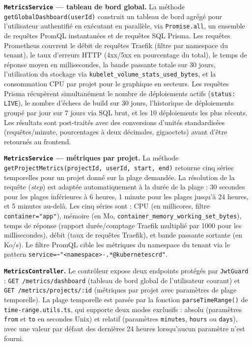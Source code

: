 \textbf{\texttt{MetricsService} — tableau de bord global.} La méthode \texttt{getGlobalDashboard(userId)} construit un tableau de bord agrégé pour l'utilisateur authentifié en exécutant en parallèle, via \texttt{Promise.all}, un ensemble de requêtes PromQL instantanées et de requêtes SQL Prisma. Les requêtes Prometheus couvrent le débit de requêtes Traefik (filtre par namespace du tenant), le taux d'erreurs HTTP (4xx/5xx en pourcentage du total), le temps de réponse moyen en millisecondes, la bande passante totale sur 30 jours, l'utilisation du stockage via \texttt{kubelet\_volume\_stats\_used\_bytes}, et la consommation CPU par projet pour le graphique en secteurs. Les requêtes Prisma récupèrent simultanément le nombre de déploiements actifs (\texttt{status: LIVE}), le nombre d'échecs de build sur 30 jours, l'historique de déploiements groupé par jour sur 7 jours via SQL brut, et les 10 déploiements les plus récents. Les résultats sont post-traités avec des conversions d'unités standardisées (requêtes/minute, pourcentages à deux décimales, gigaoctets) avant d'être retournés au frontend.

\textbf{\texttt{MetricsService} — métriques par projet.} La méthode \texttt{getProjectMetrics(projectId, userId, start, end)} retourne cinq séries temporelles pour un projet donné sur la plage demandée. La résolution de la requête (\textit{step}) est adaptée automatiquement à la durée de la plage : 30 secondes pour les plages inférieures à 6 heures, 1 minute pour les plages jusqu'à 24 heures, et 5 minutes au-delà. Les cinq séries sont : CPU (en millicores, filtre \texttt{container="app"}), mémoire (en Mo, \texttt{container\_memory\_working\_set\_bytes}), temps de réponse (rapport durée/comptage Traefik multiplié par 1000 pour les millisecondes), débit (taux de requêtes Traefik), et bande passante sortante (en Ko/s). Le filtre PromQL cible les métriques du namespace du tenant via le pattern \texttt{service=\textasciitilde"<namespace>-.*@kubernetescrd"}.

\textbf{\texttt{MetricsController}.} Le contrôleur expose deux endpoints protégés par \texttt{JwtGuard} : \texttt{GET /metrics/dashboard} (tableau de bord global de l'utilisateur courant) et \texttt{GET /metrics/projects/:id} (métriques par projet avec paramètres de plage temporelle). La plage temporelle est parsée par la fonction \texttt{parseTimeRange()} de \texttt{time-range.utils.ts}, qui supporte deux modes exclusifs : absolu (paramètres \texttt{from} et \texttt{to} en secondes Unix) et relatif (paramètres \texttt{minutes}, \texttt{hours} ou \texttt{days}), avec une valeur par défaut des dernières 24 heures lorsqu'aucun paramètre n'est fourni.

